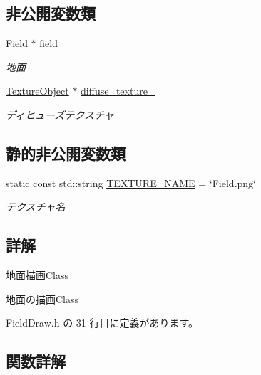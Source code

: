 \subsection*{非公開変数類}
\begin{DoxyCompactItemize}
\item 
\mbox{\hyperlink{class_field}{Field}} $\ast$ \mbox{\hyperlink{class_field_draw_a5d81171db83ea98a33c0e6f68b5dd351}{field\+\_\+}}
\begin{DoxyCompactList}\small\item\em 地面 \end{DoxyCompactList}\item 
\mbox{\hyperlink{class_texture_object}{Texture\+Object}} $\ast$ \mbox{\hyperlink{class_field_draw_aae75fe96d822d266a44815520f6ab3dc}{diffuse\+\_\+texture\+\_\+}}
\begin{DoxyCompactList}\small\item\em ディヒューズテクスチャ \end{DoxyCompactList}\end{DoxyCompactItemize}
\subsection*{静的非公開変数類}
\begin{DoxyCompactItemize}
\item 
static const std\+::string \mbox{\hyperlink{class_field_draw_a0100eac615b34df95aaf3627182fb9f1}{T\+E\+X\+T\+U\+R\+E\+\_\+\+N\+A\+ME}} = \char`\"{}Field.\+png\char`\"{}
\begin{DoxyCompactList}\small\item\em テクスチャ名 \end{DoxyCompactList}\end{DoxyCompactItemize}


\subsection{詳解}
地面描画\+Class 

地面の描画\+Class 

 Field\+Draw.\+h の 31 行目に定義があります。



\subsection{関数詳解}
\mbox{\label{class_field_draw_a1915497654d079074dbd3e058db06a78}} 
